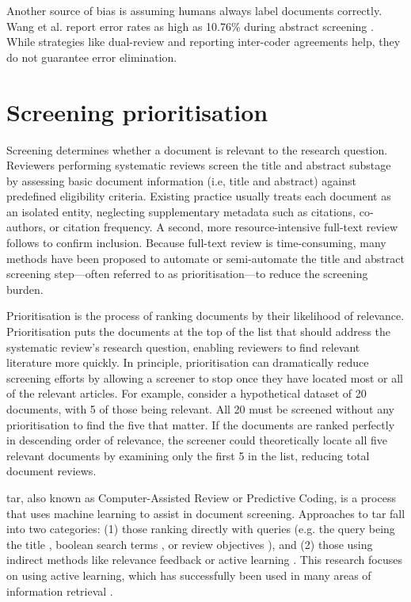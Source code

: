 \documentclass[10pt,oneside]{book}
\begin{document}
Another source of bias is assuming humans always label documents correctly. Wang et al. report error rates as high as 10.76\% during abstract screening \cite{wang_error_2020}. While strategies like dual-review and reporting inter-coder agreements help, they do not guarantee error elimination.

\section{Screening prioritisation}\label{sec:screening Priorisation}

Screening determines whether a document is relevant to the research question. Reviewers performing systematic reviews screen the title and abstract substage by assessing basic document information (i.e, title and abstract) against predefined eligibility criteria. Existing practice usually treats each document as an isolated entity, neglecting supplementary metadata such as citations, co-authors, or citation frequency.  A second, more resource-intensive full-text review follows to confirm inclusion. Because full-text review is time-consuming, many methods have been proposed to automate or semi-automate the title and abstract screening step—often referred to as prioritisation—to reduce the screening burden.

Prioritisation is the process of ranking documents by their likelihood of relevance. Prioritisation puts the documents at the top of the list that should address the systematic review's research question, enabling reviewers to find relevant literature more quickly. In principle, prioritisation can dramatically reduce screening efforts by allowing a screener to stop once they have located most or all of the relevant articles. For example, consider a hypothetical dataset of 20 documents, with 5 of those being relevant. All 20 must be screened without any prioritisation to find the five that matter. If the documents are ranked perfectly in descending order of relevance, the screener could theoretically locate all five relevant documents by examining only the first 5 in the list, reducing total document reviews. 

\gls*{tar}, also known as Computer-Assisted Review or Predictive Coding, is a process that uses machine learning to assist in document screening. Approaches to \gls*{tar} fall into two categories: (1) those ranking directly with queries (e.g. the query being the title \cite{alharbi_ranking_2017, alharbi_retrieving_2018}, boolean search terms  \cite{alharbi_ranking_2017, alharbi_retrieving_2018, alharbi_ranking_2019}, or review objectives \cite{ferro_qut_2017, scells_integrating_2017}), and (2) those using indirect methods like relevance feedback \cite{alharbi_ranking_2019} or active learning \cite{cormack_technology-assisted_2017, cormack_systems_2019, grossman_technology-assisted_2010, grossman_automatic_2017}. This research focuses on using active learning, which has successfully been used in many areas of information retrieval \cite{cormack_autonomy_2015, cormack_engineering_2016, yu_fast2_2019, yu_finding_2018, miwa_reducing_2014}.
\end{document}

